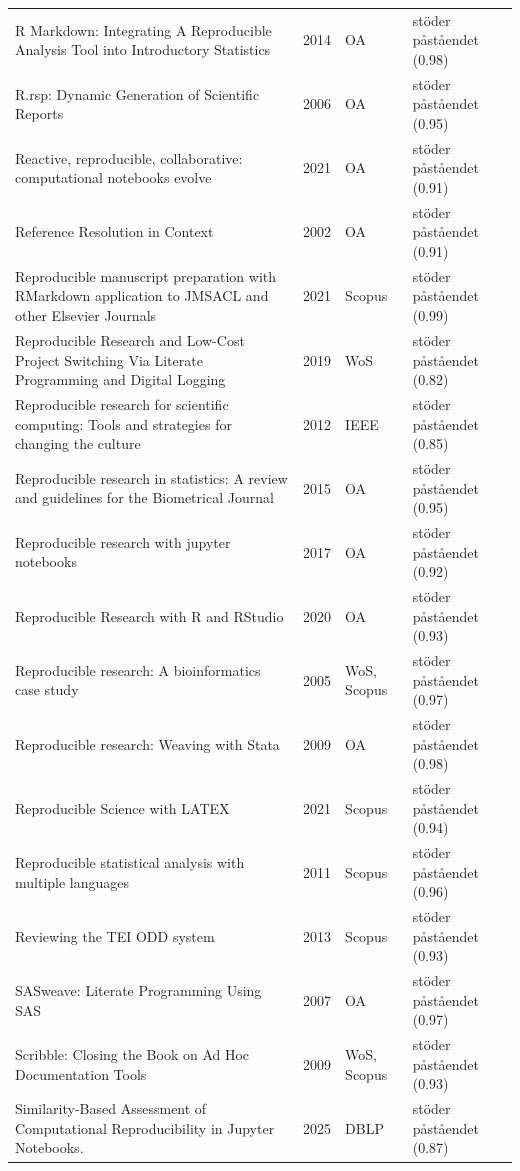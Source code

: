 \begin{longtable}{@{}%
  >{\raggedright\arraybackslash}p{}c%
  >{\raggedright\arraybackslash}p{}%
  >{\raggedright\arraybackslash}p{}@{}}
R Markdown: Integrating A Reproducible Analysis Tool into Introductory Statistics & 2014 & OA & stöder påståendet (0.98) \\
R.rsp: Dynamic Generation of Scientific Reports & 2006 & OA & stöder påståendet (0.95) \\
Reactive, reproducible, collaborative: computational notebooks evolve & 2021 & OA & stöder påståendet (0.91) \\
Reference Resolution in Context & 2002 & OA & stöder påståendet (0.91) \\
Reproducible manuscript preparation with RMarkdown application to JMSACL and other Elsevier Journals & 2021 & Scopus & stöder påståendet (0.99) \\
Reproducible Research and Low-Cost Project Switching Via Literate Programming and Digital Logging & 2019 & WoS & stöder påståendet (0.82) \\
Reproducible research for scientific computing: Tools and strategies for changing the culture & 2012 & IEEE & stöder påståendet (0.85) \\
Reproducible research in statistics: A review and guidelines for the Biometrical Journal & 2015 & OA & stöder påståendet (0.95) \\
Reproducible research with jupyter notebooks & 2017 & OA & stöder påståendet (0.92) \\
Reproducible Research with R and RStudio & 2020 & OA & stöder påståendet (0.93) \\
Reproducible research: A bioinformatics case study & 2005 & WoS, Scopus & stöder påståendet (0.97) \\
Reproducible research: Weaving with Stata & 2009 & OA & stöder påståendet (0.98) \\
Reproducible Science with LATEX & 2021 & Scopus & stöder påståendet (0.94) \\
Reproducible statistical analysis with multiple languages & 2011 & Scopus & stöder påståendet (0.96) \\
Reviewing the TEI ODD system & 2013 & Scopus & stöder påståendet (0.93) \\
SASweave: Literate Programming Using SAS & 2007 & OA & stöder påståendet (0.97) \\
Scribble: Closing the Book on Ad Hoc Documentation Tools & 2009 & WoS, Scopus & stöder påståendet (0.93) \\
Similarity-Based Assessment of Computational Reproducibility in Jupyter Notebooks. & 2025 & DBLP & stöder påståendet (0.87) \\

\end{longtable}
